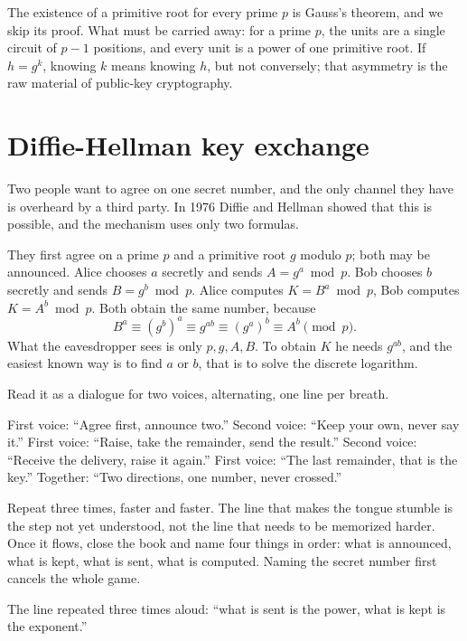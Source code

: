 The existence of a primitive root for every prime $p$ is Gauss's theorem, and we skip its proof. What
must be carried away: for a prime $p$, the units are a single circuit of $p-1$ positions, and every
unit is a power of one primitive root. If $h=g^k$, knowing $k$ means knowing $h$, but not
conversely; that asymmetry is the raw material of public-key cryptography.


\section{Diffie-Hellman key exchange}

Two people want to agree on one secret number, and the only channel they have is overheard by a third
party. In 1976 Diffie and Hellman showed that this is possible, and the mechanism uses only two
formulas.

They first agree on a prime $p$ and a primitive root $g$ modulo $p$; both may be announced. Alice
chooses $a$ secretly and sends $A=g^a\bmod p$. Bob chooses $b$ secretly and sends $B=g^b\bmod p$.
Alice computes $K=B^a\bmod p$, Bob computes $K=A^b\bmod p$. Both obtain the same number, because
\[
B^a\equiv(g^b)^a\equiv g^{ab}\equiv(g^a)^b\equiv A^b\pmod p .
\]
What the eavesdropper sees is only $p,g,A,B$. To obtain $K$ he needs $g^{ab}$, and the easiest known
way is to find $a$ or $b$, that is to solve the discrete logarithm.

\begin{bacakeras}
Read it as a dialogue for two voices, alternating, one line per breath.

First voice: ``Agree first, announce two.''
Second voice: ``Keep your own, never say it.''
First voice: ``Raise, take the remainder, send the result.''
Second voice: ``Receive the delivery, raise it again.''
First voice: ``The last remainder, that is the key.''
Together: ``Two directions, one number, never crossed.''

Repeat three times, faster and faster. The line that makes the tongue stumble is the step not yet
understood, not the line that needs to be memorized harder. Once it flows, close the book and name
four things in order: what is announced, what is kept, what is sent, what is computed. Naming the
secret number first cancels the whole game.

The line repeated three times aloud: ``what is sent is the power, what is kept is the exponent.''
\end{bacakeras}

